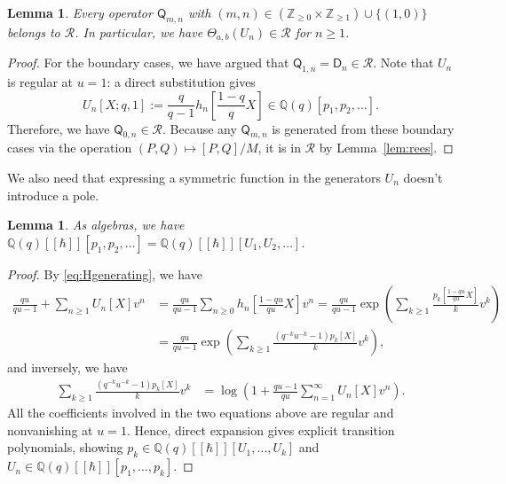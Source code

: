 \documentclass[12pt,reqno]{amsart}
\numberwithin{equation}{section}
\newtheorem{lemma}[theorem]{Lemma}
\theoremstyle{definition}
\theoremstyle{remark}
\theoremstyle{plain}
\newcommand{\NN}{\mathbb Z_{\ge0}}
\newcommand{\ZZ}{\mathbb Z}
\newcommand{\QQ}{\mathbb Q}
\newcommand{\Qop}{\mathsf Q}
\newcommand{\Dop}{\mathsf D}
\begin{document}
\begin{lemma}\label{lem:qopregular}
    Every operator $\Qop_{m,n}$ with $(m,n)\in (\NN\times \ZZ_{\ge 1})\cup \{(1,0)\}$ belongs to $\mathscr R$. In particular, we have $\Theta_{a,b}(U_n)\in \mathscr{R}$ for $n\ge 1$.
\end{lemma}
\begin{proof}
    For the boundary cases, we have argued that $\Qop_{1,n}=\Dop_n\in \mathscr R$. Note that $U_n$ is regular at $u=1$: a direct substitution gives
    \begin{equation}\label{eq:UkSpecial}
        U_n[X;q,1]:=\frac{q}{q-1}
        h_n\left[\frac{1-q}{q}X\right]\in \QQ(q)[p_1,p_2,\dots].
    \end{equation}
    Therefore, we have $\Qop_{0,n}\in \mathscr R$. Because any $\Qop_{m,n}$ is generated from these boundary cases via the operation $(P,Q)\mapsto [P,Q]/M$, it is in $\mathscr R$ by Lemma~\ref{lem:rees}.
\end{proof}



We also need that
expressing a symmetric function in the generators $U_n$ doesn't introduce a
pole.  
\begin{lemma}\label{lem:u-p-transition}
    As algebras, we have $\QQ(q)[[\hbar]][p_1,p_2,\dots]=\QQ(q)[[\hbar]][U_1,U_2,\dots]$.
\end{lemma}
\begin{proof}
    By \eqref{eq:Hgenerating}, we have
    \begin{align*}
        \frac{qu}{qu-1}+\sum_{n\geq 1} U_n[X]v^n&=\frac{qu}{qu-1}\sum_{n\geq 0} h_n\left[\frac{1-qu}{qu}X\right]v^n=\frac{qu}{qu-1}\exp\left( \sum_{k\geq 1} \frac{p_k\left[\frac{1-qu}{qu}X\right]}{k}v^k\right)\\
        &=\frac{qu}{qu-1}\exp\left( \sum_{k\geq 1} \frac{(q^{-k}u^{-k}-1)p_k\left[X\right]}{k}v^k\right),
    \end{align*}
    and inversely, we have
    \begin{align*}
        \sum_{k\geq 1} \frac{(q^{-k}u^{-k}-1)p_k\left[X\right]}{k}v^k&=\log\left(1+\frac{qu-1}{qu}\sum_{n=1}^\infty U_n[X]v^n\right).
    \end{align*}
    All the coefficients involved in the two equations above are regular and nonvanishing at $u=1$. Hence, direct expansion gives explicit transition polynomials, showing $p_k\in \QQ(q)[[\hbar]][U_1,\dots,U_k]$ and $U_n\in \QQ(q)[[\hbar]][p_1,\dots,p_k]$.
\end{proof}
\end{document}
